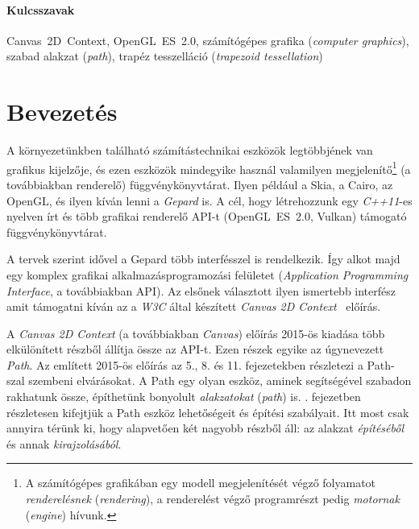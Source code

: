 \documentclass[12pt]{report}
\theoremstyle{definition}
\newcommand{\inenglish}[1]{\textsl{#1}}
\newcommand{\inenglishfn}[1]{\footnotesize{\inenglish{#1}}}
\begin{document}
    \subsubsection*{Kulcsszavak}

 Canvas~2D~Context, OpenGL~ES~2.0, számítógépes grafika (\inenglish{computer
 graphics}), szabad alakzat (\inenglish{path}), trapéz tesszelláció
 (\inenglish{trapezoid tessellation})



    \chapter*{Bevezetés}
    \label{sec:Bevezetés}

A környezetünkben található számítástechnikai eszközök legtöbbjének van
grafikus kijelzője, és ezen eszközök mindegyike használ valamilyen
megjelenítő\footnote{A számítógépes grafikában egy modell megjelenítését végző
folyamatot \emph{renderelésnek} (\inenglishfn{rendering}), a renderelést végző
programrészt pedig \emph{motornak} (\inenglishfn{engine}) hívunk.} (a
továbbiakban renderelő) függvénykönyvtárat. Ilyen például a Skia, a Cairo, az
OpenGL, és ilyen kíván lenni a \emph{Gepard} is. A cél, hogy létrehozzunk egy
\emph{C++11}-es nyelven írt és több grafikai renderelő API-t (OpenGL~ES~2.0,
Vulkan) támogató függvénykönyvtárat.

A tervek szerint idővel a Gepard több interfésszel is rendelkezik. Így alkot
majd egy komplex grafikai alkalmazásprogramozási felületet
(\inenglish{Application Programming Interface}, a továbbiakban API). Az elsőnek
választott ilyen ismertebb interfész amit támogatni kíván az a \emph{W3C} által
készített \emph{Canvas 2D Context}~\cite{Cabanier:14:HCC} előírás.

A \emph{Canvas 2D Context} (a továbbiakban \emph{Canvas}) előírás 2015-ös
kiadása több elkülönített részből állítja össze az API-t. Ezen részek egyike az
úgynevezett \emph{Path}. Az említett 2015-ös előírás az 5., 8. és 11.
fejezetekben részletezi a Path-szal szembeni elvárásokat. A Path egy olyan
eszköz, aminek segítségével szabadon rakhatunk össze, építhetünk bonyolult
\emph{alakzatokat} (\inenglish{path}) is. . fejezetben
részletesen kifejtjük a Path eszköz lehetőségeit és építési szabályait. Itt
most csak annyira térünk ki, hogy alapvetően két nagyobb részből áll: az
alakzat \emph{építéséből} és annak \emph{kirajzolásából}.
\end{document}
